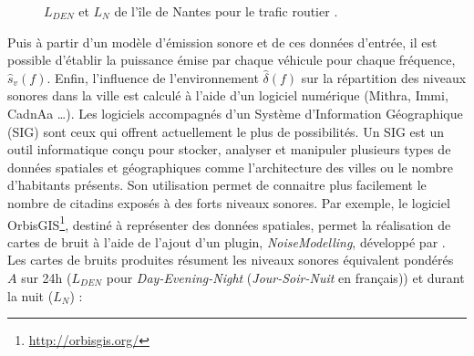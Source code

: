 \begin{figure}[t]
\centering
{}
\caption{$L_{DEN}$  et $L_N$  de l'île de Nantes pour le trafic routier \cite{nantes_carte}.}
\label{fig:carto_nantes}
\end{figure}

Puis à partir d'un modèle d'émission sonore et de ces données d'entrée, il est possible d'établir la puissance émise par chaque véhicule pour chaque fréquence, $\hat{s}_{v}(f)$.
Enfin, l'influence de l'environnement $\hat{\delta}(f)$ sur la répartition des niveaux sonores dans la ville est calculé à l'aide d'un logiciel numérique (Mithra, Immi, CadnAa \dots). Les logiciels accompagnés d'un Système d'Information Géographique (SIG) sont ceux qui offrent actuellement le plus de possibilités. Un SIG est un outil informatique conçu pour stocker, analyser et manipuler plusieurs types de données spatiales et géographiques comme l'architecture des villes ou le nombre d'habitants présents.
Son utilisation permet de connaitre plus facilement le nombre de citadins exposés à des forts niveaux sonores.
Par exemple, le logiciel OrbisGIS\footnote{\url{http://orbisgis.org/}}, destiné à représenter des données spatiales, permet la réalisation de cartes de bruit à l'aide de l'ajout d'un plugin, \textit{NoiseModelling}, développé par \cite{fortin}. \\

Les cartes de bruits produites résument les niveaux sonores équivalent pondérés $A$ sur 24h ($L_{DEN}$ pour \textit{Day-Evening-Night} (\textit{Jour-Soir-Nuit} en français)) et durant la nuit ($L_N$) :


